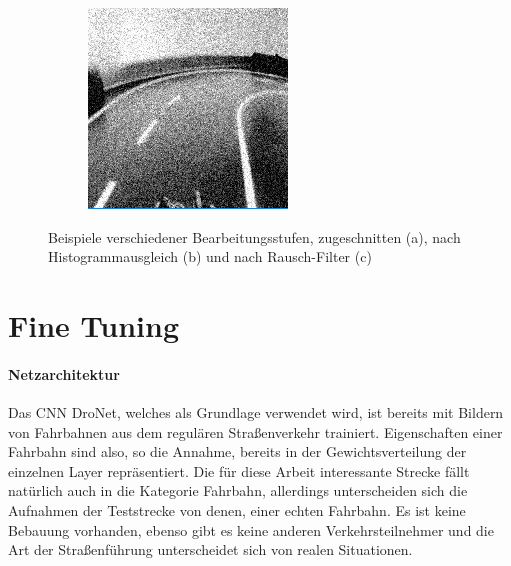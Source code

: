 \begin{figure}[h]
\begin{subfigure}{.33\textwidth}
	 	  \caption{}
		  \label{fig:imageb}
	\end{subfigure}%
	\begin{subfigure}{.33\textwidth}
	\centering
		  \includegraphics[width=0.9\linewidth]{figures/200x200Gauss.png}
	 	  \caption{}
		  \label{fig:imagec}
	\end{subfigure}%
	\caption{Beispiele verschiedener Bearbeitungsstufen, zugeschnitten (a), nach Histogrammausgleich (b) und nach Rausch-Filter (c) }
	\label{fig:pipelineexample}
\end{figure}%

\section{Fine Tuning}

\paragraph{Netzarchitektur}
Das CNN DroNet, welches als Grundlage verwendet wird, ist bereits mit Bildern von Fahrbahnen aus dem regulären Straßenverkehr trainiert. Eigenschaften einer Fahrbahn sind also, so die Annahme, bereits in der Gewichtsverteilung der einzelnen Layer repräsentiert. Die für diese Arbeit interessante Strecke fällt natürlich auch in die Kategorie Fahrbahn, allerdings unterscheiden sich die Aufnahmen der Teststrecke von denen, einer echten Fahrbahn. Es ist keine Bebauung vorhanden, ebenso gibt es keine anderen Verkehrsteilnehmer und die Art der Straßenführung unterscheidet sich von realen Situationen.

